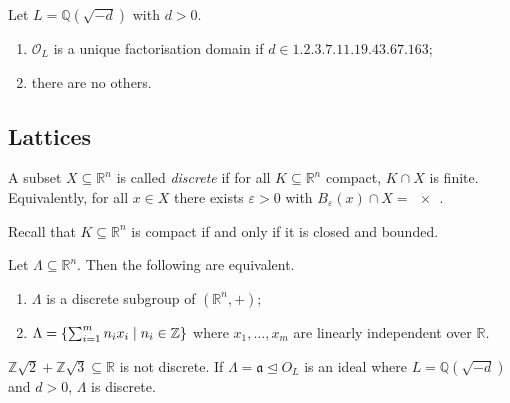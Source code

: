\begin{theorem}
    Let \( L = \mathbb Q(\sqrt{-d}) \) with \( d > 0 \).
    \begin{enumerate}
        \item \( \mathcal O_L \) is a unique factorisation domain if \( d \in \qty{1, 2, 3, 7, 11, 19, 43, 67, 163} \);
        \item there are no others.
    \end{enumerate}
\end{theorem}

\subsection{Lattices}
\begin{definition}
    A subset \( X \subseteq \mathbb R^n \) is called \emph{discrete} if for all \( K \subseteq \mathbb R^n \) compact, \( K \cap X \) is finite.
    Equivalently, for all \( x \in X \) there exists \( \varepsilon > 0 \) with \( B_\varepsilon(x) \cap X = \qty{x} \).
\end{definition}
Recall that \( K \subseteq \mathbb R^n \) is compact if and only if it is closed and bounded.
\begin{proposition}
    Let \( \Lambda \subseteq \mathbb R^n \).
    Then the following are equivalent.
    \begin{enumerate}
        \item \( \Lambda \) is a discrete subgroup of \( (\mathbb R^n, +) \);
        \item \( \Lambda = \qty{\sum_{i=1}^m n_i x_i \mid n_i \in \mathbb Z} \) where \( x_1, \dots, x_m \) are linearly independent over \( \mathbb R \).
    \end{enumerate}
\end{proposition}
\begin{example}
    \( \mathbb Z\sqrt{2} + \mathbb Z\sqrt{3} \subseteq \mathbb R \) is not discrete.
    If \( \Lambda = \mathfrak a \trianglelefteq O_L \) is an ideal where \( L = \mathbb Q(\sqrt{-d}) \) and \( d > 0 \), \( \Lambda \) is discrete.
\end{example}
